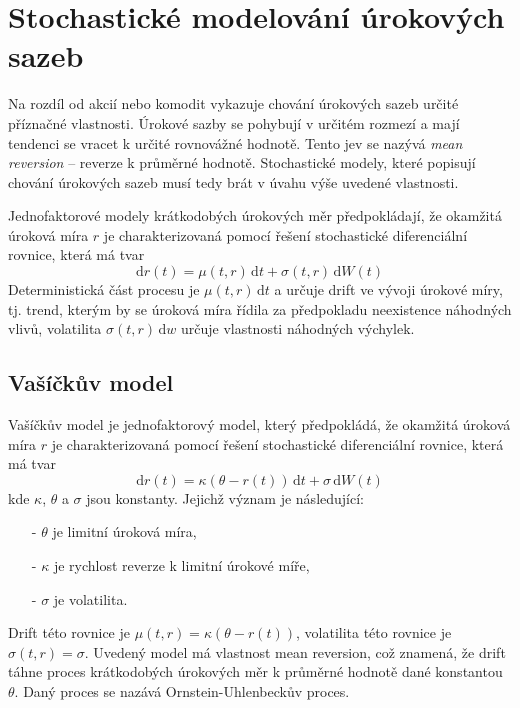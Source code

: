 \documentclass[a4paper,12pt]{report}
\theoremstyle{definition} \newtheorem{definice}[veta]{Definice}
\theoremstyle{remark}
\begin{document}
\section{Stochastické modelování úrokových sazeb}
Na rozdíl od akcií nebo komodit vykazuje chování úrokových sazeb určité příznačné vlastnosti. %
Úrokové sazby se pohybují v určitém rozmezí a %
mají tendenci se vracet k určité rovnovážné hodnotě.
Tento jev se nazývá \textit{mean reversion} -- reverze k průměrné hodnotě.
Stochastické modely, které popisují chování úrokových sazeb musí tedy brát v úvahu výše uvedené vlastnosti.


Jednofaktorové modely krátkodobých úrokových měr předpokládají, že okamžitá úroková míra $r$ je charakterizovaná pomocí řešení stochastické diferenciální rovnice, která má tvar
\begin{equation}\label{model_urok_miry}
\mathrm{d}r(t)=\mu(t,r)\,\mathrm{d}t+\sigma(t,r)\,\mathrm{d}W(t)
\end{equation}
Deterministická část procesu je $\mu(t, r)\,\mathrm{d}t$ a určuje drift ve vývoji úrokové míry, tj. trend, kterým by se úroková míra řídila za předpokladu neexistence náhodných vlivů, volatilita $\sigma(t, r)\,\mathrm{d}w$ určuje vlastnosti náhodných výchylek.

\subsection{Vašíčkův model}
Vašíčkův model je jednofaktorový model, který předpokládá, že okamžitá úroková míra $r$ je charakterizovaná pomocí řešení stochastické diferenciální rovnice, která má tvar
\begin{equation}\label{Vasickuv_model}
\mathrm{d}r(t) = \kappa(\theta - r(t))\,\mathrm{d}t + \sigma\,\mathrm{d}W(t)
\end{equation}
kde $\kappa$, $\theta$ a $\sigma$ jsou konstanty. 
Jejichž význam je následující:
\begin{itemize}
\item[-] $\theta$ je limitní úroková míra, 
\item[-] $\kappa$ je rychlost reverze k limitní úrokové míře, 
\item[-] $\sigma$ je volatilita.
\end{itemize}

Drift této rovnice je $\mu(t, r) = \kappa ( \theta - r(t))$, volatilita této rovnice je $\sigma(t, r) = \sigma$. 
Uvedený model má vlastnost mean reversion, což znamená, že drift táhne proces krátkodobých úrokových měr k průměrné hodnotě dané konstantou $\theta$. 
Daný proces se nazává Ornstein-Uhlenbeckův proces.
\end{document}
